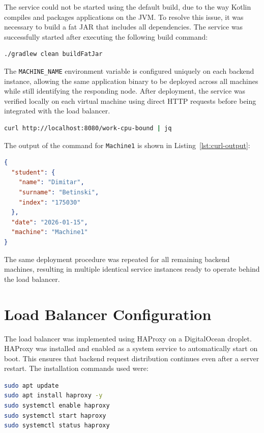 \documentclass[conference]{IEEEtran}
\begin{document}
The service could not be started using the default build, due to the way Kotlin compiles and packages applications on the JVM. To resolve this issue, it was necessary to build a fat JAR that includes all dependencies. The service was successfully started after executing the following build command:

\begin{lstlisting}[language=bash, caption=The actual build command that worked, label=lst:fatjar]
./gradlew clean buildFatJar
\end{lstlisting}

The \texttt{MACHINE\_NAME} environment variable is configured uniquely on each backend instance, allowing the same application binary to be deployed across all machines while still identifying the responding node. After deployment, the service was verified locally on each virtual machine using direct HTTP requests before being integrated with the load balancer.

\begin{lstlisting}[language=bash, caption=Local backend verification using curl]
curl http://localhost:8080/work-cpu-bound | jq
\end{lstlisting}

The output of the command for \texttt{Machine1} is shown in Listing~\ref{lst:curl-output}:

\begin{lstlisting}[language=json, caption=Sample JSON response from the backend, label=lst:curl-output]
{
  "student": {
    "name": "Dimitar",
    "surname": "Betinski",
    "index": "175030"
  },
  "date": "2026-01-15",
  "machine": "Machine1"
}
\end{lstlisting}

The same deployment procedure was repeated for all remaining backend machines, resulting in multiple identical service instances ready to operate behind the load balancer.

\section{Load Balancer Configuration}

The load balancer was implemented using HAProxy on a DigitalOcean droplet. HAProxy was installed and enabled as a system service to automatically start on boot. This ensures that backend request distribution continues even after a server restart. The installation commands used were:

\begin{lstlisting}[language=bash, caption=Installing and enabling HAProxy on Ubuntu]
sudo apt update
sudo apt install haproxy -y
sudo systemctl enable haproxy
sudo systemctl start haproxy
sudo systemctl status haproxy
\end{lstlisting}
\end{document}
